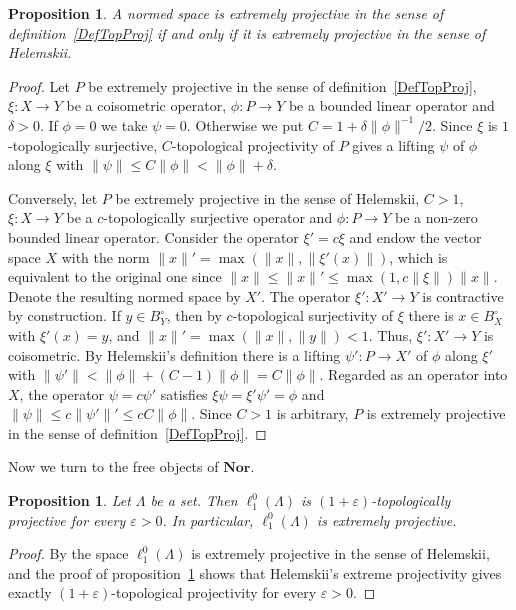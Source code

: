 \documentclass[12pt]{article}
\newtheorem{proposition}[theorem]{Proposition}
\newcommand{\Nor}{\mathbf{Nor}}
\newcommand{\lo}[1]{\ell_1^0(#1)}
\newcommand{\norm}[1]{\lVert #1\rVert}
\begin{document}
\begin{proposition}\label{EquivWithHelemskii} A normed space is extremely
    projective in the sense of definition~\ref{DefTopProj} if and only if it
    is extremely projective in the sense of Helemskii.
\end{proposition}
\begin{proof} Let $P$ be extremely projective in the sense of
    definition~\ref{DefTopProj}, $\xi:X\to Y$ be a coisometric
    operator, $\phi:P\to Y$ be a bounded linear operator and $\delta>0$. If
    $\phi=0$ we take $\psi=0$. Otherwise we put
    $C=1+\delta\norm{\phi}^{-1}/2$. Since $\xi$ is $1$-topologically surjective,
    $C$-topological projectivity of $P$ gives a lifting $\psi$ of $\phi$ along
    $\xi$ with $\norm{\psi}\leq C\norm{\phi}<\norm{\phi}+\delta$.

    Conversely, let $P$ be extremely projective in the sense of Helemskii,
    $C>1$, $\xi:X\to Y$ be a
    $c$-topologically surjective operator and $\phi:P\to Y$ be a non-zero
    bounded linear operator. Consider the operator $\xi'=c\xi$ and endow the
    vector space $X$ with the norm $\norm{x}'=\max(\norm{x},\norm{\xi'(x)})$,
    which is equivalent to the original one since $\norm{x}\leq\norm{x}'\leq
    \max(1,c\norm{\xi})\norm{x}$. Denote the resulting normed space by $X'$.
    The operator $\xi':X'\to Y$ is contractive by construction. If $y\in
    B_Y^\circ$, then by $c$-topological surjectivity of $\xi$ there is $x\in
    B_X^\circ$ with $\xi'(x)=y$, and $\norm{x}'=\max(\norm{x},\norm{y})<1$.
    Thus, $\xi':X'\to Y$ is coisometric. By Helemskii's definition there is a
    lifting $\psi':P\to X'$ of $\phi$ along $\xi'$ with $\norm{\psi'}<
    \norm{\phi}+(C-1)\norm{\phi}=C\norm{\phi}$. Regarded as an operator into
    $X$, the operator $\psi=c\psi'$ satisfies $\xi\psi=\xi'\psi'=\phi$ and
    $\norm{\psi}\leq c\norm{\psi'}'\leq cC\norm{\phi}$. Since $C>1$ is arbitrary,
    $P$ is extremely projective in the sense of definition~\ref{DefTopProj}.
\end{proof}

Now we turn to the free objects of $\Nor$.

\begin{proposition}\label{FreeIsExtrProj} Let $\Lambda$ be a set. Then
    $\lo{\Lambda}$ is $(1+\varepsilon)$-topologically projective for every
    $\varepsilon>0$. In particular, $\lo{\Lambda}$ is extremely projective.
\end{proposition}
\begin{proof} By \cite[proposition 2.2]{HelExtrProjSeqAlg} the space
    $\lo{\Lambda}$ is extremely projective in the sense of Helemskii, and
    the proof of proposition~\ref{EquivWithHelemskii} shows that Helemskii's extreme
    projectivity gives exactly
    $(1+\varepsilon)$-topological projectivity for every $\varepsilon>0$.
\end{proof}
\end{document}
